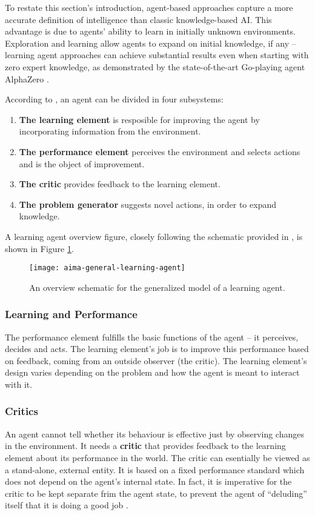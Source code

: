 To restate this section's introduction, agent-based approaches capture a more accurate definition of intelligence than classic knowledge-based AI.
This advantage is due to agents' ability to learn in initially unknown environments.
Exploration and learning allow agents to expand on initial knowledge, if any --
learning agent approaches can achieve substantial results even when starting with zero expert knowledge, as demonstrated by the state-of-the-art Go-playing agent AlphaZero \cite{alpha-zero}.

According to \cite{aima}, an agent can be divided in four subsystems:
\begin{enumerate}
    \item \textbf{The learning element} is resposible for improving the agent by incorporating information from the environment.
    \item \textbf{The performance element} perceives the environment and selects actions and is the object of improvement.
    \item \textbf{The critic} provides feedback to the learning element.
    \item \textbf{The problem generator} suggests novel actions, in order to expand knowledge.    
\end{enumerate}

A learning agent overview figure, closely following the schematic provided in \cite{aima}, is shown in Figure \ref{fig:aima-learning-agent}.

\begin{figure}[ht]
    \texttt{[image: aima-general-learning-agent]}
    \centering
    \caption{An overview schematic for the generalized model of a learning agent.}
    \label{fig:aima-learning-agent}
\end{figure}

\subsubsection{Learning and Performance}
The performance element fulfills the basic functions of the agent -- it perceives, decides and acts.
The learning element's job is to improve this performance based on feedback, coming from an outside observer (the critic).
The learning element's design varies depending on the problem and how the agent is meant to interact with it.

\subsubsection{Critics}
An agent cannot tell whether its behaviour is effective just by observing changes in the environment.
It needs a \textbf{critic} that provides feedback to the learning element about its performance in the world.
The critic can esentially be viewed as a stand-alone, external entity.
It is based on a fixed performance standard which does not depend on the agent's internal state.
In fact, it is imperative for the critic to be kept separate frim the agent state, to prevent the agent of ``deluding'' itself that it is doing a good job \cite{aima}.

